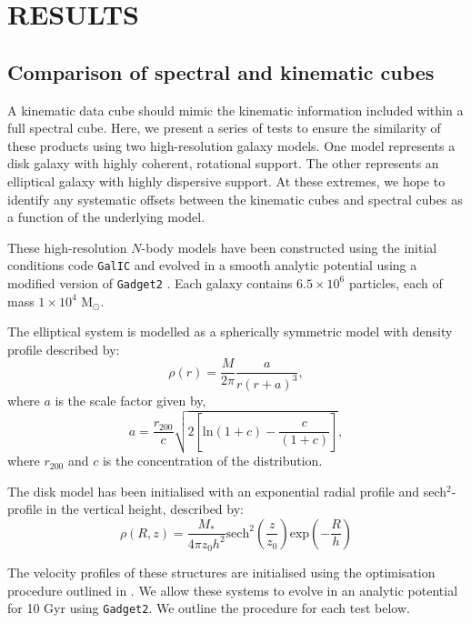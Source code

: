 \documentclass[
  journal=pasa,
  manuscript=research-paper, %
  year=2020,
  volume=37,
]{cup-journal}
\begin{document}
\section{RESULTS}

\subsection{Comparison of spectral and kinematic cubes}
\label{sec:cs1}

A kinematic data cube should mimic the kinematic information included within a full spectral cube. 
Here, we present a series of tests to ensure the similarity of these products using two high-resolution galaxy models.
One model represents a disk galaxy with highly coherent, rotational support.
The other represents an elliptical galaxy with highly dispersive support. 
At these extremes, we hope to identify any systematic offsets between the kinematic cubes and spectral cubes as a function of the underlying model. 

These high-resolution $N$-body models have been constructed using the initial conditions code \texttt{GalIC} \citep{Yurin2014AnEquilibrium} and evolved in a smooth analytic potential using a modified version of \texttt{Gadget2} \citep{Springel2005TheGADGET-2}. 
Each galaxy contains $6.5 \times 10^{6}$ particles, each of mass $1 \times 10^{4}$ M$_{\odot}$. 

The elliptical system is modelled as a spherically symmetric model with density profile described by:
\begin{equation}
    \rho(r) = \frac{M}{2 \pi} \frac{a}{r(r+a)^3},
\end{equation}
where $a$ is the scale factor given by,
\begin{equation}
    a = \frac{r_{200}}{c}\sqrt{2 \left[ \text{ln}(1 + c) - \frac{c}{(1 + c)} \right]},
\end{equation}
where $r_{200}$ and $c$ is the concentration of the distribution. 

The disk model has been initialised with an exponential radial profile and sech$^{2}$-profile in the vertical height, described by:
\begin{equation}
    \rho(R,z) = \frac{M_*}{4 \pi z_{0} h^2}\text{sech}^2\left( \frac{z}{z_{0}} \right)\text{exp}\left( - \frac{R}{h} \right)
\end{equation}

The velocity profiles of these structures are initialised using the optimisation procedure outlined in \citealt{Yurin2014AnEquilibrium}. 
We allow these systems to evolve in an analytic potential for 10 Gyr using \texttt{Gadget2}. We outline the procedure for each test below.
\end{document}
